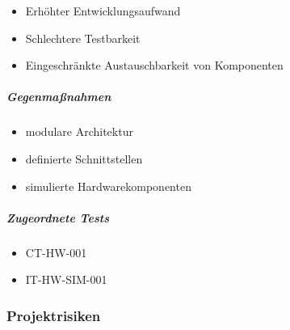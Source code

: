 \documentclass[
  a4paper,
  12pt,
  DIV=12,        %
  parskip=half,  %
  headings=small %
]{scrartcl}
\theoremstyle{definition}
\providecommand{\tightlist}{%
  \setlength{\itemsep}{0pt}\setlength{\parskip}{0pt}}
\theoremstyle{definition}
\begin{document}
\begin{itemize}
\tightlist
\item
  Erhöhter Entwicklungsaufwand
\item
  Schlechtere Testbarkeit
\item
  Eingeschränkte Austauschbarkeit von Komponenten
\end{itemize}

\subparagraph{Gegenmaßnahmen}\label{gegenmauxdfnahmen-3}

\begin{itemize}
\tightlist
\item
  modulare Architektur
\item
  definierte Schnittstellen
\item
  simulierte Hardwarekomponenten
\end{itemize}

\subparagraph{Zugeordnete Tests}\label{zugeordnete-tests-3}

\begin{itemize}
\tightlist
\item
  CT-HW-001
\item
  IT-HW-SIM-001
\end{itemize}

\subsubsection{Projektrisiken}\label{projektrisiken}
\end{document}
